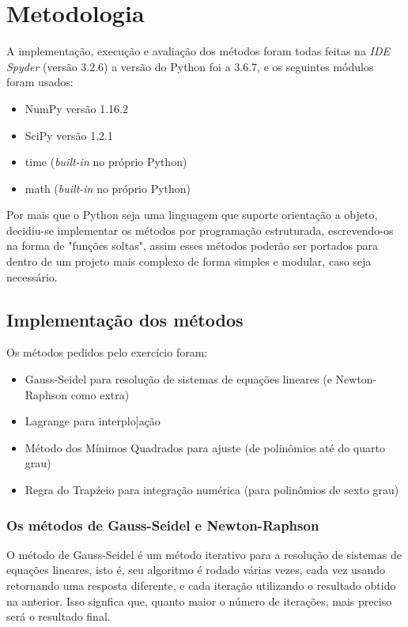 \documentclass[12pt,A4]{report}
\begin{document}
\section{Metodologia}
A implementação, execução e avaliação dos métodos foram todas feitas na \textit{IDE Spyder} (versão 3.2.6) a versão do Python foi a 3.6.7, e os seguintes módulos foram usados:
\begin{itemize}
    \item NumPy versão 1.16.2
    \item SciPy versão 1.2.1
    \item time (\textit{built-in} no próprio Python)
    \item math (\textit{built-in} no próprio Python)
\end{itemize}
Por mais que o Python seja uma linguagem que suporte orientação a objeto, decidiu-se implementar os métodos por programação estruturada, escrevendo-os na forma de "funções soltas", assim esses métodos poderão ser portados para dentro de um projeto mais complexo de forma simples e modular, caso seja necessário.

\subsection{Implementação dos métodos}
Os métodos pedidos pelo exercício foram:
\begin{itemize}
    \item Gauss-Seidel para resolução de sistemas de equações lineares (e Newton-Raphson como extra)
    \item Lagrange para interplo]ação
    \item Método dos Mínimos Quadrados para ajuste (de polinômios até do quarto grau)
    \item Regra do Trapźeio para integração numérica (para polinômios de sexto grau)
\end{itemize}

\subsubsection{Os métodos de Gauss-Seidel e Newton-Raphson}
O método de Gauss-Seidel é um método iterativo para a resolução de sistemas de equações lineares, isto é, seu algoritmo é rodado várias vezes, cada vez usando retornando uma resposta diferente, e cada iteração utilizando o resultado obtido na anterior. Isso signfica que, quanto maior o número de iterações, mais preciso será o resultado final.
\end{document}
